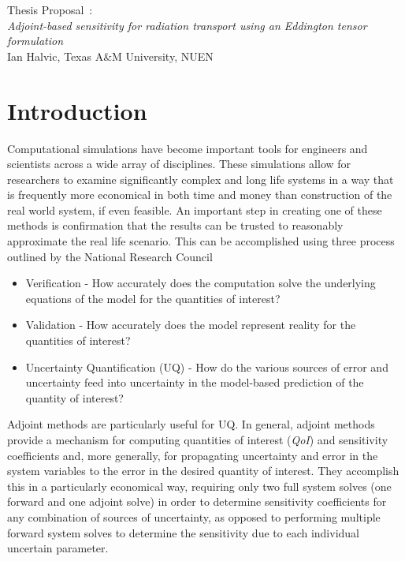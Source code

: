 \documentclass{article}
\newcommand{\qoi}{{\it QoI}\xspace}
\begin{document}
\begin{center}
{\large Thesis Proposal~:\\
{\it Adjoint-based sensitivity for radiation transport using an Eddington tensor formulation}}\\
\vspace{2mm}
Ian Halvic, Texas A\&M University, NUEN
\end{center}

\tableofcontents
\newpage

\section{Introduction}

Computational simulations have become important tools for engineers and scientists across a wide array of disciplines. These simulations allow for researchers to examine significantly complex and long life systems in a way that is frequently more economical in both time and money than construction of the real world system, if even feasible. An important step in creating one of these methods is confirmation that the results can be trusted to reasonably approximate the real life scenario. This can be accomplished using three process outlined by the National Research Council \cite{NRCVVUQ}


\begin{itemize}
\item Verification - How accurately does the computation solve the underlying equations of the model for the quantities of interest?
\item Validation - How accurately does the model represent reality for the quantities of interest?
\item Uncertainty Quantification (UQ) -  How do the various sources of error and uncertainty feed into uncertainty in the model-based prediction of the quantity of interest?
\end{itemize}


Adjoint methods are particularly useful for UQ. In general, adjoint methods provide a mechanism for computing quantities of interest (\qoi) and sensitivity coefficients and, more generally, for propagating uncertainty and error in the system variables to the error in the desired quantity of interest. They accomplish this in a particularly economical way, requiring only two full system solves (one forward and one adjoint solve) in order to determine sensitivity coefficients for any combination of sources of uncertainty, as opposed to performing multiple forward system solves to determine
the sensitivity due to each individual uncertain parameter.
\end{document}
